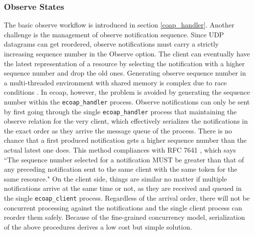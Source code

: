 \subsubsection{Observe States}

The basic observe workflow is introduced in section \autoref{coap_handler}. Another challenge is the management of observe notification sequence. Since UDP datagrams can get reordered, observe notifications must carry a strictly increasing sequence number in the Observe option. The client can eventually have the latest representation of a resource by selecting the notification with a higher sequence number and drop the old ones. Generating observe sequence number in a multi-threaded environment with shared memory is complex due to race conditions \autocite{kovatsch2015scalable}. In ecoap, however, the problem is avoided by generating the sequence number within the \verb|ecoap_handler| process. Observe notifications can only be sent by first going through the single \verb|ecoap_handler| process that maintaining the observe relation for the very client, which effectively serializes the notifications in the exact order as they arrive the message queue of the process. There is no chance that a first produced notification gets a higher sequence number than the actual latest one does. This method compliances with RFC 7641 \autocite{coap_observe}, which says ``The sequence number selected for a notification MUST be greater than that of any preceding notification sent to the same client with the same token for the same resource." On the client side, things are similar no matter if multiple notifications arrive at the same time or not, as they are received and queued in the single \verb|ecoap_client| process. Regardless of the arrival order, there will not be concurrent processing against the notifications and the single client process can reorder them safely. Because of the fine-grained concurrency model, serialization of the above procedures derives a low cost but simple solution. 





